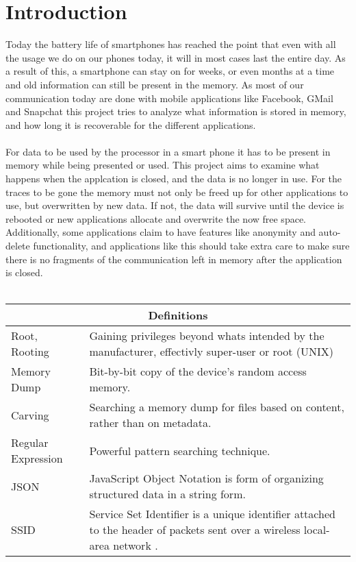 \section{Introduction}
Today the battery life of smartphones has reached the point that even with all the usage we do on our phones today, it will in most cases last the entire day. As a result of this, a smartphone can stay on for weeks, or even months at a time and old information can still be present in the memory. As most of our communication today are done with mobile applications like Facebook, GMail and Snapchat this project tries to analyze what information is stored in memory, and how long it is recoverable for the different applications. \\ \\
For data to be used by the processor in a smart phone it has to be present in memory while being presented or used. This project aims to examine what happens when the applcation is closed, and the data is no longer in use. For the traces to be gone the memory must not only be freed up for other applications to use, but overwritten by new data. If not, the data will survive until the device is rebooted or new applications allocate and overwrite the now free space. Additionally, some applications claim to have features like anonymity and auto-delete functionality, and applications like this should take extra care to make sure there is no fragments of the communication left in memory after the application is closed.
\\ \\
\begin{tabular}{ |p{3cm}|p{4cm}|  }
 \hline
 \multicolumn{2}{|c|}{\textbf{Definitions}} \\
 \hline
 Root, Rooting&Gaining privileges beyond whats intended by the manufacturer, effectivly super-user or root (UNIX) \\
 \hline
  Memory Dump& Bit-by-bit copy of the device's random access memory.\\
 \hline
 Carving& Searching a memory dump for  files based on content, rather than on metadata.\\
 \hline
 Regular Expression & Powerful pattern searching technique.\\
 \hline
 JSON & JavaScript Object Notation is form of organizing structured data in a string form.\\
 \hline
 SSID & Service Set Identifier is a unique identifier attached to the header of packets sent over a wireless local-area network .\\
 \hline
\end{tabular}